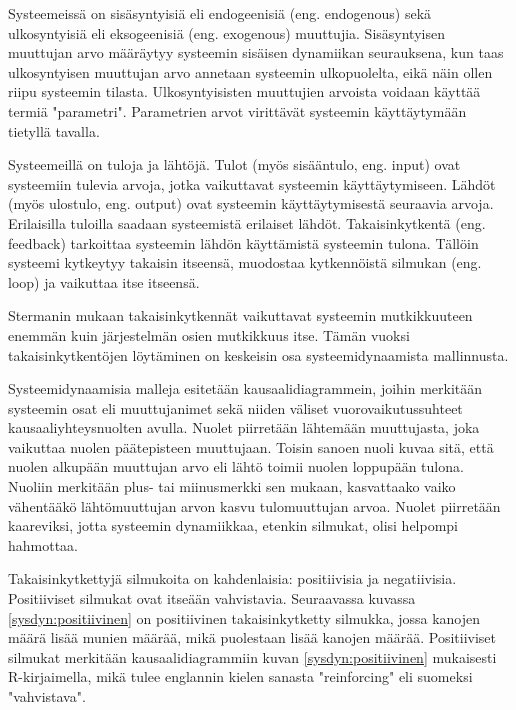 \documentclass[finnish,12pt,a4paper,pdftex]{article}
\begin{document}
\begin{onehalfspacing}
Systeemeissä on sisäsyntyisiä eli endogeenisiä (eng. endogenous) sekä ulkosyntyisiä eli eksogeenisiä (eng. exogenous) muuttujia. Sisäsyntyisen muuttujan arvo määräytyy systeemin sisäisen dynamiikan seurauksena, kun taas ulkosyntyisen muuttujan arvo annetaan systeemin ulkopuolelta, eikä näin ollen riipu systeemin tilasta. Ulkosyntyisisten muuttujien arvoista voidaan käyttää termiä "parametri". Parametrien arvot virittävät systeemin käyttäytymään tietyllä tavalla. \cite{Sterman2000} %

Systeemeillä on tuloja ja lähtöjä. Tulot (myös sisääntulo, eng. input) ovat systeemiin tulevia arvoja, jotka vaikuttavat systeemin käyttäytymiseen. Lähdöt (myös ulostulo, eng. output) ovat systeemin käyttäytymisestä seuraavia arvoja. Erilaisilla tuloilla saadaan systeemistä erilaiset lähdöt. Takaisinkytkentä (eng. feedback) tarkoittaa systeemin lähdön käyttämistä systeemin tulona. Tällöin systeemi kytkeytyy takaisin itseensä, muodostaa kytkennöistä silmukan (eng. loop) ja vaikuttaa itse itseensä. \cite{Sterman2000, WhatIsSystemDynamics} 

Stermanin \cite[s. 12]{Sterman2000} mukaan takaisinkytkennät vaikuttavat systeemin mutkikkuuteen enemmän kuin järjestelmän osien mutkikkuus itse. Tämän vuoksi takaisinkytkentöjen löytäminen on keskeisin osa systeemidynaamista mallinnusta. 

Systeemidynaamisia malleja esitetään kausaalidiagrammein, joihin merkitään systeemin osat eli muuttujanimet sekä niiden väliset vuorovaikutussuhteet kausaaliyhteysnuolten avulla. Nuolet piirretään lähtemään muuttujasta, joka vaikuttaa nuolen päätepisteen muuttujaan. Toisin sanoen nuoli kuvaa sitä, että nuolen alkupään muuttujan arvo eli lähtö toimii nuolen loppupään tulona. Nuoliin merkitään plus- tai miinusmerkki sen mukaan, kasvattaako vaiko vähentääkö lähtömuuttujan arvon kasvu tulomuuttujan arvoa. Nuolet piirretään kaareviksi, jotta systeemin dynamiikkaa, etenkin silmukat, olisi helpompi hahmottaa. \cite{Sterman2000}

Takaisinkytkettyjä silmukoita on kahdenlaisia: positiivisia ja negatiivisia. Positiiviset silmukat ovat itseään vahvistavia. Seuraavassa kuvassa \ref{sysdyn:positiivinen} on positiivinen takaisinkytketty silmukka, jossa kanojen määrä lisää munien määrää, mikä puolestaan lisää kanojen määrää. Positiiviset silmukat merkitään kausaalidiagrammiin kuvan \ref{sysdyn:positiivinen} mukaisesti R-kirjaimella, mikä tulee englannin kielen sanasta "reinforcing" eli suomeksi "vahvistava". \cite[s. 12--13]{Sterman2000}\cite{WhatIsSystemDynamics}


\end{onehalfspacing}
\end{document}
